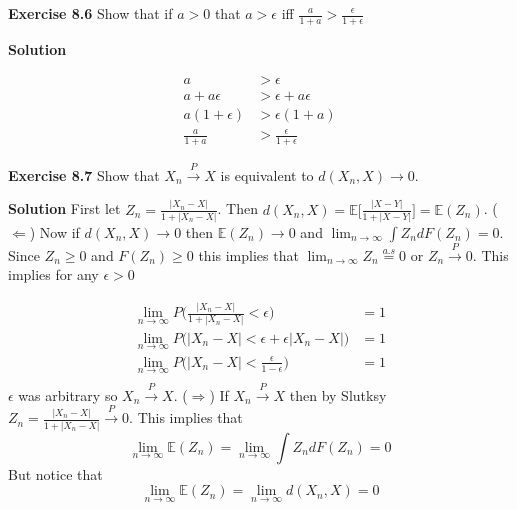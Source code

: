 \documentclass[12pt]{article}  %
\newcommand{\e}{{\epsilon}}
\newcommand{\E}{{\mathbb{E}}}
\begin{document}
\textbf{Exercise 8.6} Show that if $a>0$ that $a>\e$ iff $\frac{a}{1+a}>\frac{\e}{1+\e}$

\textbf{Solution}

\begin{align*}
a &> \e\\
a +a\e &> \e+a\e\\
a(1+\e)&> \e(1+a)\\
\frac{a}{1+a}&>\frac{\e}{1+\e}
\end{align*}

\newpage

\textbf{Exercise 8.7} Show that $X_n\overset{P}{\to}X$ is equivalent to $d(X_n, X)\to0$.

\textbf{Solution} First let $Z_n = \frac{|X_n-X|}{1 + |X_n-X|}$. Then $d(X_n,X) = \E\bigg[\frac{|X-Y|}{1+|X-Y|}\bigg] = \E(Z_n)$. ($\Longleftarrow$) Now if $d(X_n, X)\to 0$ then $\E(Z_n)\to 0$ and $\lim_{n\to\infty}\int Z_ndF(Z_n) = 0$. Since $Z_n\geq 0$ and $F(Z_n)\geq 0$ this implies that $\lim_{n\to\infty}Z_n \overset{a.s}{=} 0$ or $Z_n\overset{P}{\to}0$. This implies for any $\e>0$

\begin{align*}
\lim_{n\to\infty}P\Big(\frac{|X_n -X|}{1 +|X_n -X|}<\e\Big) &= 1\\
\lim_{n\to\infty}P\Big(|X_n -X|<\e + \e|X_n -X|\Big) &= 1\\
\lim_{n\to\infty}P\Big(|X_n -X|<\frac{\e}{1-\e}\Big) &= 1\\
\end{align*}
$\e$ was arbitrary so $X_n\overset{P}{\to}X$. ($\Longrightarrow$) If $X_n\overset{P}{\to}X$ then by Slutksy $Z_n = \frac{|X_n -X|}{1+|X_n -X|}\overset{P}{\to} 0$. This implies that $$\lim_{n\to\infty}\E(Z_n) = \lim_{n\to\infty}\int Z_n dF(Z_n) = 0$$
But notice that $$\lim_{n\to\infty}\E(Z_n) = \lim_{n\to\infty}d(X_n, X) = 0 $$
\end{document}
